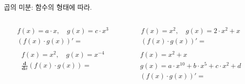\documentclass[aspectratio=169]{beamer}
\begin{document}
\begin{frame}{곱의 미분: 함수의 형태에 따라.}
  \begin{columns}
    \begin{column}{.5\textwidth}
      \begin{align*}
        & f(x) = a \cdot x , \quad g(x) = c \cdot x^3 \\
        & (f(x) \cdot g(x))' = \\
      \end{align*}
      \begin{align*}
        & f(x) = x^2 , \quad g(x) = x^{-4} \\
        & \frac{\mathbf{d}}{\mathbf{d}x}(f(x) \cdot g(x)) = \\
      \end{align*}
    \end{column}
    \begin{column}{.5\textwidth}
      \begin{align*}
        & f(x) = x^2 , \quad g(x) = 2 \cdot x^2 + x \\
        & (f(x) \cdot g(x))' = \\
      \end{align*}
      \begin{align*}
        & f(x) = x^2 + x \\
        & g(x) = a \cdot x^{10} + b \cdot x^5 + c \cdot x^2 + d \\
        & (f(x) \cdot g(x))' = \\
      \end{align*}  
    \end{column}
  \end{columns}
\end{frame}
\end{document}
